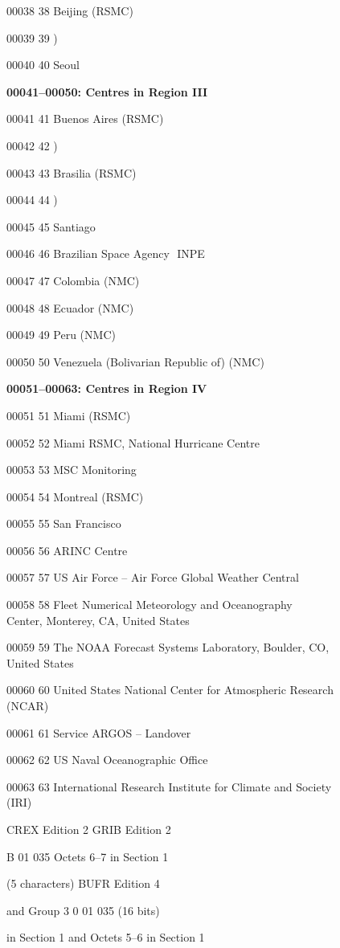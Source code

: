 00038 38 Beijing (RSMC)

00039 39 )

00040 40 Seoul

\textbf{00041--00050: Centres in Region III}

00041 41 Buenos Aires (RSMC)

00042 42 )

00043 43 Brasilia (RSMC)

00044 44 )

00045 45 Santiago

00046 46 Brazilian Space Agency ­ INPE

00047 47 Colombia (NMC)

00048 48 Ecuador (NMC)

00049 49 Peru (NMC)

00050 50 Venezuela (Bolivarian Republic of) (NMC)

\textbf{00051--00063: Centres in Region IV}

00051 51 Miami (RSMC)

00052 52 Miami RSMC, National Hurricane Centre

00053 53 MSC Monitoring

00054 54 Montreal (RSMC)

00055 55 San Francisco

00056 56 ARINC Centre

00057 57 US Air Force -- Air Force Global Weather Central

00058 58 Fleet Numerical Meteorology and Oceanography\\
Center, Monterey, CA, United States

00059 59 The NOAA Forecast Systems Laboratory, Boulder, CO,\\
United States

00060 60 United States National Center for Atmospheric Research\\
(NCAR)

00061 61 Service ARGOS -- Landover

00062 62 US Naval Oceanographic Office

00063 63 International Research Institute for Climate and Society\\
(IRI)

CREX Edition 2 GRIB Edition 2

B 01 035 Octets 6--7 in Section 1

(5 characters) BUFR Edition 4

and Group 3 0 01 035 (16 bits)

in Section 1 and Octets 5--6 in Section 1

